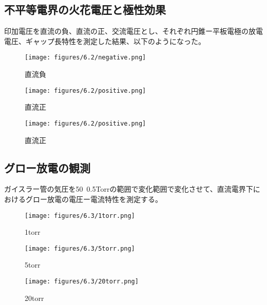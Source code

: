 \documentclass{ltjsarticle}
\begin{document}
\subsection{不平等電界の火花電圧と極性効果}
印加電圧を直流の負、直流の正、交流電圧とし、それぞれ円錐ー平板電極の放電電圧、ギャップ長特性を測定した結果、以下のようになった。

\begin{figure}[H]
    \centering
    \begin{minipage}[b]{0.48\textwidth}
      \texttt{[image: figures/6.2/negative.png]}
      \caption{直流負}
    \end{minipage}
    \hfill
    \begin{minipage}[b]{0.48\textwidth}
      \texttt{[image: figures/6.2/positive.png]}
      \caption{直流正}
    \end{minipage}
\end{figure}

\begin{figure}[H]
    \begin{center}
        \texttt{[image: figures/6.2/positive.png]}
        \caption{直流正}
    \end{center}
\end{figure}

\newpage
\subsection{グロー放電の観測}
ガイスラー管の気圧を50~0.5Torrの範囲で変化範囲で変化させて、直流電界下におけるグロー放電の電圧ー電流特性を測定する。

\begin{figure}[H]
    \centering
    \begin{minipage}[b]{0.48\textwidth}
      \texttt{[image: figures/6.3/1torr.png]}
      \caption{1torr}
    \end{minipage}
    \hfill
    \begin{minipage}[b]{0.48\textwidth}
      \texttt{[image: figures/6.3/5torr.png]}
      \caption{5torr}
    \end{minipage}
\end{figure}

\begin{figure}[H]
    \begin{center}
        \texttt{[image: figures/6.3/20torr.png]}
        \caption{20torr}
    \end{center}
\end{figure}
\end{document}
